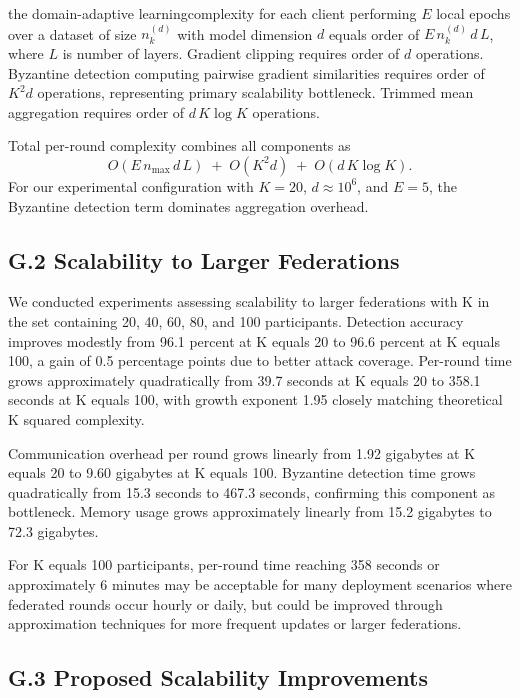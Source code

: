 \documentclass[12pt,a4paper]{article}
\theoremstyle{definition}
\begin{document}
\begingroup
\setlength{\emergencystretch}{2em} %
the domain-adaptive learningcomplexity for each client performing \(E\) local epochs over a dataset of size \(n_k^{(d)}\) with model dimension \(d\) equals order of \(E\,n_k^{(d)}\,d\,L\), where \(L\) is number of layers. Gradient clipping requires order of \(d\) operations. Byzantine detection computing pairwise gradient similarities requires order of \(K^{2}d\) operations, representing primary scalability bottleneck. Trimmed mean aggregation requires order of \(d\,K\log K\) operations.

Total per-round complexity combines all components as
\[
O\!\left(E\,n_{\max}\,d\,L\right)\;+\;O\!\left(K^{2}d\right)\;+\;O\!\left(d\,K\log K\right).
\]
For our experimental configuration with \(K=20\), \(d\approx 10^{6}\), and \(E=5\), the Byzantine detection term dominates aggregation overhead.
\par\endgroup


\subsection{G.2 Scalability to Larger Federations}

We conducted experiments assessing scalability to larger federations with K in the set containing 20, 40, 60, 80, and 100 participants. Detection accuracy improves modestly from 96.1 percent at K equals 20 to 96.6 percent at K equals 100, a gain of 0.5 percentage points due to better attack coverage. Per-round time grows approximately quadratically from 39.7 seconds at K equals 20 to 358.1 seconds at K equals 100, with growth exponent 1.95 closely matching theoretical K squared complexity.

Communication overhead per round grows linearly from 1.92 gigabytes at K equals 20 to 9.60 gigabytes at K equals 100. Byzantine detection time grows quadratically from 15.3 seconds to 467.3 seconds, confirming this component as bottleneck. Memory usage grows approximately linearly from 15.2 gigabytes to 72.3 gigabytes.

For K equals 100 participants, per-round time reaching 358 seconds or approximately 6 minutes may be acceptable for many deployment scenarios where federated rounds occur hourly or daily, but could be improved through approximation techniques for more frequent updates or larger federations.

\subsection{G.3 Proposed Scalability Improvements}
\end{document}
